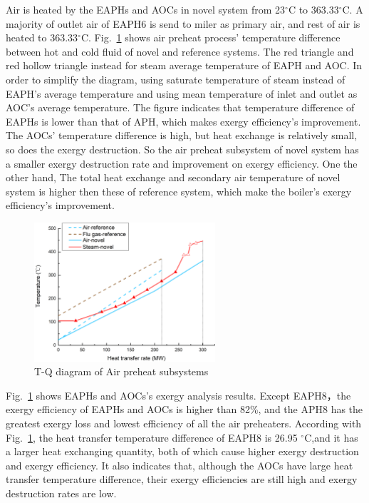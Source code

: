\documentclass[preprint,12pt]{elsarticle}
\begin{document}
Air is heated by the EAPHs and AOCs in novel system from 23$^\circ$C to 363.33$^\circ$C. 
A majority of outlet air of EAPH6 is send to miler as primary air, and rest of air is heated to 363.33$^\circ$C.
Fig.~\ref{fig:APH_temper_compare} shows air preheat process' temperature difference between hot and cold fluid of novel and reference systems.
The red triangle and red hollow triangle instead for steam average temperature of EAPH and AOC. 
In order to simplify the diagram, using saturate temperature of steam instead of EAPH's average temperature and using mean temperature of inlet and outlet as AOC's average temperature.
The figure indicates that  temperature difference of EAPHs is lower than that of APH, which makes exergy efficiency's improvement.
The AOCs' temperature difference is high, but heat exchange is relatively small, so does the exergy destruction. 
So the air preheat subsystem  of novel system has a smaller exergy destruction rate and improvement on exergy efficiency.
One the other hand, The total heat exchange and secondary air temperature of novel system is higher then these of reference system, which make the boiler's exergy efficiency's improvement.

\begin{figure}[htbp]
\centering
\includegraphics[width=0.6\textwidth]{fig/APH_temper_compare.png}
\caption{T-Q diagram of Air preheat subsystems} 
\label{fig:APH_temper_compare}
\end{figure}


Fig.~\ref{fig:APH_temper_compare} shows EAPHs and AOCs's exergy analysis results. 
Except EAPH8，the exergy efficiency of EAPHs and AOCs is higher than 82\%, and the APH8 has the greatest exergy loss and lowest efficiency of all the air preheaters. 
According with Fig.~\ref{fig:APH_temper_compare}, the heat transfer temperature difference of EAPH8 is 26.95 $^\circ$C,and it has a larger heat exchanging quantity, both of which cause higher exergy destruction and exergy efficiency.
It also indicates that, although the AOCs have large heat transfer temperature difference, their exergy efficiencies are still high and  exergy destruction rates are low.
\end{document}
